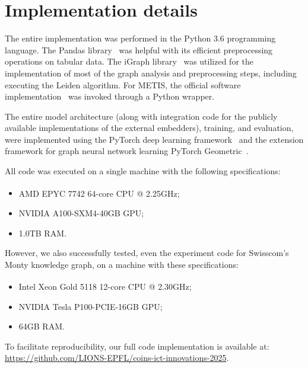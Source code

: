 \section{Implementation details}
\label{sec:appendix_implementation}

The entire implementation was performed in the Python 3.6 programming language. The Pandas library~\cite{mckinney_data_2010} was helpful with its efficient preprocessing operations on tabular data. The iGraph library~\cite{csardi_igraph_2005} was utilized for the implementation of most of the graph analysis and preprocessing steps, including executing the Leiden algorithm. For METIS, the official software implementation~\cite{karypis_metis_1997} was invoked through a Python wrapper. 

The entire model architecture (along with integration code for the publicly available implementations of the external embedders), training, and evaluation, were implemented using the PyTorch deep learning framework~\cite{paszke_pytorch_2019} and the extension framework for graph neural network learning PyTorch Geometric~\cite{fey_fast_2019}. 

All code was executed on a single machine with the following specifications:
\begin{itemize}
    \item AMD EPYC\textsuperscript{\texttrademark} 7742 64-core CPU @ 2.25GHz;
    \item NVIDIA A100-SXM4-40GB GPU;
    \item 1.0TB RAM. 
\end{itemize}
However, we also successfully tested, even the experiment code for Swisscom's Monty knowledge graph, on a machine with these specifications:
\begin{itemize}
    \item Intel\textsuperscript{\textregistered} Xeon\textsuperscript{\textregistered} Gold 5118 12-core CPU @ 2.30GHz;
    \item NVIDIA Tesla P100-PCIE-16GB GPU;
    \item 64GB RAM.
\end{itemize}

To facilitate reproducibility, our full code implementation is available at:
\url{https://github.com/LIONS-EPFL/coins-ict-innovations-2025}.

